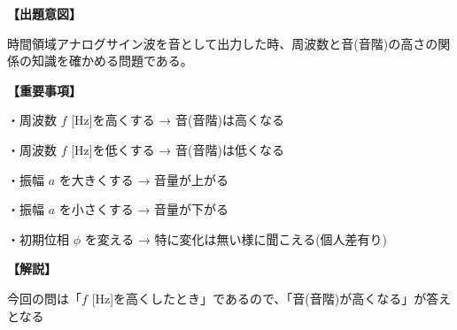 \noindent \textbf{【出題意図】}

\noindent 時間領域アナログサイン波を音として出力した時、周波数と音(音階)の高さの関係の知識を確かめる問題である。

\vspace{1em}
\noindent \textbf{【重要事項】}

\medskip
\noindent ・周波数 $f$ [Hz]を高くする → 音(音階)は高くなる

\medskip
\noindent ・周波数 $f$ [Hz]を低くする → 音(音階)は低くなる

\medskip
\noindent ・振幅 $a$ を大きくする → 音量が上がる

\medskip
\noindent ・振幅 $a$ を小さくする → 音量が下がる

\medskip
\noindent ・初期位相 $\phi$ を変える → 特に変化は無い様に聞こえる(個人差有り)

\vspace{1em}
\noindent \textbf{【解説】}

\noindent 今回の問は「$f$ [Hz]を高くしたとき」であるので、「音(音階)が高くなる」が答えとなる
